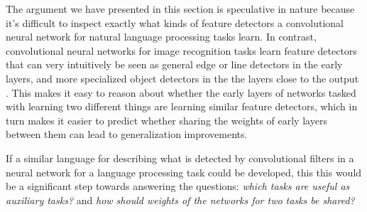 \noindent
The argument we have presented in this section is speculative in nature because it's difficult to inspect exactly what kinds of feature detectors a convolutional neural network for natural language processing tasks learn. In contrast, convolutional neural networks for image recognition tasks learn feature detectors that can very intuitively be seen as general edge or line detectors in the early layers, and more specialized object detectors in the the layers close to the output \citep{goodfellow16}. This makes it easy to reason about whether the early layers of networks tasked with learning two different things are learning similar feature detectors, which in turn makes it easier to predict whether sharing the weights of early layers between them can lead to generalization improvements. 

If a similar language for describing what is detected by convolutional filters in a neural network for a language processing task could be developed, this this would be a significant step towards answering the questions: \textit{which tasks are useful as auxiliary tasks?} and \textit{how should weights of the networks for two tasks be shared?}

